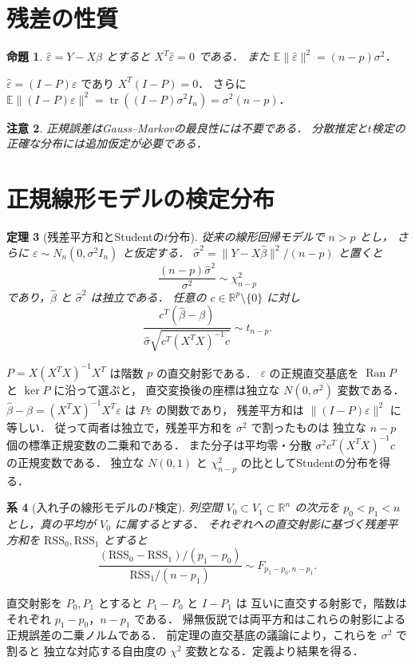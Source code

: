 \documentclass[a5paper,10pt,onecolumn]{jsarticle}
\makeatletter
\theoremstyle{mathnotetheorem}
\newtheorem{theorem}{定理}[section]
\newtheorem{proposition}[theorem]{命題}
\newtheorem{corollary}[theorem]{系}
\newtheorem{remark}[theorem]{注意}
\renewcommand{\proofname}{証明}
\renewenvironment{proof}[1][\proofname]{%
  \par\pushQED{\qed}\normalfont\topsep4\p@\@plus2\p@\relax
  \trivlist\item[\hskip\labelsep\bfseries #1]\ignorespaces
}{\popQED\endtrivlist\@endpefalse}
\newcommand{\norm}[1]{\lVert #1\rVert}
\makeatother
\begin{document}
\section{残差の性質}
\begin{proposition}
$\widehat\varepsilon=Y-X\widehat\beta$ とすると
$X^T\widehat\varepsilon=0$ である．
また $\mathbb E\norm{\widehat\varepsilon}^2=(n-p)\sigma^2$．
\end{proposition}
\begin{proof}
$\widehat\varepsilon=(I-P)\varepsilon$ であり $X^T(I-P)=0$．
さらに
$\mathbb E\norm{(I-P)\varepsilon}^2
=\operatorname{tr}((I-P)\sigma^2I_n)=\sigma^2(n-p)$．
\end{proof}
\begin{remark}
正規誤差はGauss--Markovの最良性には不要である．
分散推定と$t$検定の正確な分布には追加仮定が必要である．
\end{remark}


\section{正規線形モデルの検定分布}
\begin{theorem}[残差平方和とStudentの$t$分布]
従来の線形回帰モデルで $n>p$ とし，
さらに $\varepsilon\sim N_n(0,\sigma^2 I_n)$ と仮定する．
$\widehat\sigma^2=\norm{Y-X\widehat\beta}^2/(n-p)$ と置くと
\[
 \frac{(n-p)\widehat\sigma^2}{\sigma^2}\sim\chi^2_{n-p}
\]
であり，$\widehat\beta$ と $\widehat\sigma^2$ は独立である．
任意の $c\in\mathbb R^p\setminus\{0\}$ に対し
\[
 \frac{c^T(\widehat\beta-\beta)}
 {\widehat\sigma\sqrt{c^T(X^TX)^{-1}c}}
 \sim t_{n-p}.
\]
\end{theorem}
\begin{proof}
$P=X(X^TX)^{-1}X^T$ は階数 $p$ の直交射影である．
$\varepsilon$ の正規直交基底を
$\operatorname{Ran}P$ と $\ker P$ に沿って選ぶと，
直交変換後の座標は独立な $N(0,\sigma^2)$ 変数である．
$\widehat\beta-\beta=(X^TX)^{-1}X^T\varepsilon$ は
$P\varepsilon$ の関数であり，
残差平方和は $\norm{(I-P)\varepsilon}^2$ に等しい．
従って両者は独立で，残差平方和を $\sigma^2$ で割ったものは
独立な $n-p$ 個の標準正規変数の二乗和である．
また分子は平均零・分散
$\sigma^2c^T(X^TX)^{-1}c$ の正規変数である．
独立な $N(0,1)$ と $\chi^2_{n-p}$ の比としてStudentの分布を得る．
\end{proof}
\begin{corollary}[入れ子の線形モデルの$F$検定]
列空間 $V_0\subset V_1\subset\mathbb R^n$ の次元を
$p_0<p_1<n$ とし，真の平均が $V_0$ に属するとする．
それぞれへの直交射影に基づく残差平方和を $\mathrm{RSS}_0,\mathrm{RSS}_1$ とすると
\[
 \frac{(\mathrm{RSS}_0-\mathrm{RSS}_1)/(p_1-p_0)}
 {\mathrm{RSS}_1/(n-p_1)}\sim F_{p_1-p_0,n-p_1}.
\]
\end{corollary}
\begin{proof}
直交射影を $P_0,P_1$ とすると $P_1-P_0$ と $I-P_1$ は
互いに直交する射影で，階数はそれぞれ $p_1-p_0$，$n-p_1$ である．
帰無仮説では両平方和はこれらの射影による正規誤差の二乗ノルムである．
前定理の直交基底の議論により，これらを $\sigma^2$ で割ると
独立な対応する自由度の $\chi^2$ 変数となる．定義より結果を得る．
\end{proof}
\end{document}
